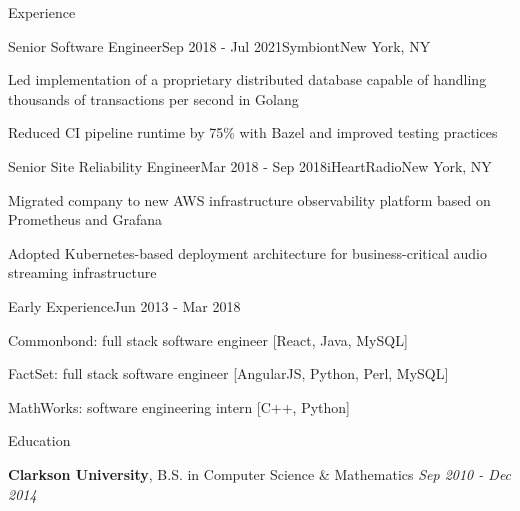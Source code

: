 \documentclass[
	10pt, %
]{resume} %
\begin{document}
\begin{rSection}{Experience}

    \begin{rSubsection}{Senior Software Engineer}{Sep 2018 - Jul 2021}{Symbiont}{New York, NY}
        \item Led implementation of a proprietary distributed database capable of handling thousands of transactions per second in Golang
        \item Reduced CI pipeline runtime by 75\% with Bazel and improved testing practices
    \end{rSubsection}


    \begin{rSubsection}{Senior Site Reliability Engineer}{Mar 2018 - Sep 2018}{iHeartRadio}{New York, NY}
        \item Migrated company to new AWS infrastructure observability platform based on Prometheus and Grafana
        \item Adopted Kubernetes-based deployment architecture for business-critical audio streaming infrastructure
    \end{rSubsection}


    \begin{rSubsection}{Early Experience}{Jun 2013 - Mar 2018}{}{}
        \item Commonbond: full stack software engineer [React, Java, MySQL]
        \item FactSet: full stack software engineer [AngularJS, Python, Perl, MySQL]
        \item MathWorks: software engineering intern [C++, Python]
    \end{rSubsection}
    
\end{rSection}


\begin{rSection}{Education}

    \textbf{Clarkson University}, B.S. in Computer Science \& Mathematics \hfill \textit{Sep 2010 - Dec 2014} \\
	
\end{rSection}
\end{document}
